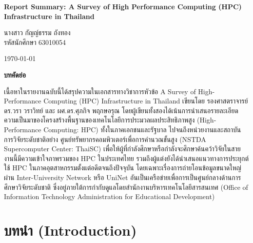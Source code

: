 \documentclass[a4paper,12pt]{extarticle}
\begin{document}
\vspace*{1cm}
{\centering
\fontsize{24pt}{28pt}\selectfont \textbf{Report Summary: A Survey of High Performance Computing (HPC) Infrastructure in Thailand} \par
\vspace{12pt}
\fontsize{16pt}{24pt}\selectfont นางสาว กัญญ์ธรรม ถังทอง \\ รหัสนักศึกษา 63010054 \par
\vspace{12pt}
\fontsize{16pt}{22pt}\selectfont \today \par
}

\vspace{12pt}
\begin{center}
    {\fontsize{18pt}{20pt}\selectfont
    \textbf{บทคัดย่อ} %
    \par
    }
	\begin{justify}
	\indent เนื้อหาในรายงานฉบับนี้ได้สรุปความในเอกสารทางวิชาการหัวข้อ A Survey of High-Performance Computing (HPC) Infrastructure in Thailand เขียนโดย รองศาสตราจารย์ ดร.วรา วราวิทย์ และ ผศ.ดร.ศุภกิจ พฤกษอรุณ โดยผู้เขียนทั้งสองได้เน้นการนำเสนอรายละเอียดความเป็นมาของโครงสร้างพื้นฐานของเทคโนโลยีการประมวลผลประสิทธิภาพสูง (High-Performance Computing: HPC) ทั้งในภาคเอกชนและรัฐบาล ไปจนถึงหน่วยงานและสถาบันการวิจัยระดับชาติอย่าง ศูนย์ทรัพยากรคอมพิวเตอร์เพื่อการคำนวณขั้นสูง (NSTDA Supercomputer Center: ThaiSC) เพื่อให้ผู้ที่กำลังศึกษาหรือกำลังจะศึกษาค้นคว้าวิจัยในสายงานนี้มีความเข้าใจภาพรวมของ HPC ในประเทศไทย รวมถึงผู้แต่งยังได้นำเสนอแนวทางการประยุกต์ใช้ HPC ในภาคอุตสาหกรรมตั้งแต่อดีตจนถึงปัจจุบัน โดยเฉพาะเรื่องการถ่ายโอนข้อมูลขนาดใหญ่ผ่าน Inter-University Network หรือ UniNet อันเป็นเครือข่ายเพื่อการเป็นศูนย์กลางด้านการศึกษาวิจัยระดับชาติ ซึ่งอยู่ภายใต้การกำกับดูแลโดยสำนักงานบริหารเทคโนโลยีสารสนเทศ (Office of Information Technology Administration for Educational Development)
	\end{justify}
\end{center}
\vspace{12pt}

\newpage

\renewcommand{\contentsname}{\centering สารบัญ}
\tableofcontents
\newpage %

\section{บทนำ (Introduction)}
\end{document}
